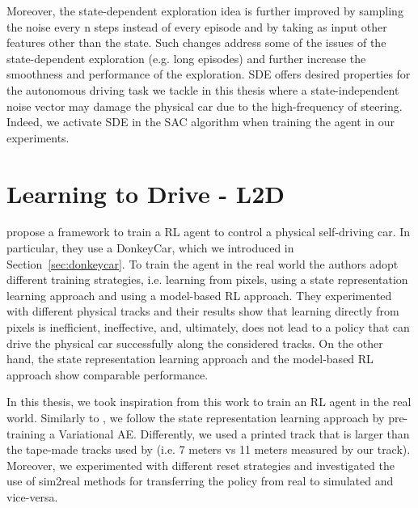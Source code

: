 Moreover, the state-dependent exploration idea is further improved by sampling the noise every n steps instead of every episode and by taking as input other features other than the state. Such changes address some of the issues of the state-dependent exploration (e.g. long episodes) and further increase the smoothness and performance of the exploration. SDE offers desired properties for the autonomous driving task we tackle in this thesis where a state-independent noise vector may damage the physical car due to the high-frequency of steering. Indeed, we activate SDE in the SAC algorithm when training the agent in our experiments.

\section{Learning to Drive - L2D}

\citet{DBLP:journals/corr/abs-2008-00715} propose a framework to train a RL agent to control a physical self-driving car. In particular, they use a DonkeyCar, which we introduced in Section~\ref{sec:donkeycar}. To train the agent in the real world the authors adopt different training strategies, i.e. learning from pixels, using a state representation learning approach and using a model-based RL approach. They experimented with different physical tracks and their results show that learning directly from pixels is inefficient, ineffective, and, ultimately, does not lead to a policy that can drive the physical car successfully along the considered tracks. On the other hand, the state representation learning approach and the model-based RL approach show comparable performance.

In this thesis, we took inspiration from this work to train an RL agent in the real world. Similarly to \citet{DBLP:journals/corr/abs-2008-00715}, we follow the state representation learning approach by pre-training a Variational AE. Differently, we used a printed track that is larger than the tape-made tracks used by \citet{DBLP:journals/corr/abs-2008-00715} (i.e. 7 meters vs 11 meters measured by our track). Moreover, we experimented with different reset strategies and investigated the use of sim2real methods for transferring the policy from real to simulated and vice-versa.